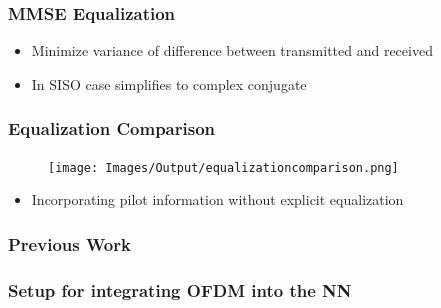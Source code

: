 \documentclass{beamer}
\begin{document}
\begin{frame}[squeeze]
	\frametitle{MMSE Equalization}
		\begin{itemize}
			\item Minimize variance of difference between transmitted and received
			\item In SISO case simplifies to complex conjugate
		\end{itemize}
\end{frame}

\begin{frame}[squeeze]
	\frametitle{Equalization Comparison}
	\begin{figure}[t]
		\texttt{[image: Images/Output/equalizationcomparison.png]}
		\centering
		\caption{\cite{felix2018ofdm}}
	\end{figure}
			\begin{itemize}
			\item Incorporating pilot information without explicit equalization
		\end{itemize}
\end{frame}

\subsubsection{Previous Work}

%	



\subsubsection{Setup for integrating OFDM into the NN}
\end{document}
